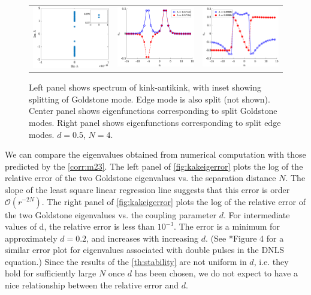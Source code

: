 \documentclass[12pt,reqno]{amsart}
\begin{document}
\begin{figure}[H]
	\begin{center}
	\begin{tabular}{ccc}
	\includegraphics[width=5cm]{kak50_8spec.eps}	&
	\includegraphics[width=5cm]{kak50_8goldstone.eps} &
	\includegraphics[width=5cm]{kak50_8edge.eps}
	\end{tabular}
	\end{center}
	\caption{Left panel shows spectrum of kink-antikink, with inset showing splitting of Goldstone mode. Edge mode is also split (not shown). Center panel shows eigenfunctions corresponding to split Goldstone modes. Right panel shows eigenfunctions corresponding to split edge modes. $d = 0.5$, $N = 4$.}
	\label{fig:kakspec}
\end{figure}

We can compare the eigenvalues obtained from numerical computation with those predicted by the \cref{corr:m23}. The left panel of \cref{fig:kakeigerror} plots the log of the relative error of the two Goldstone eigenvalues vs. the separation distance $N$. The slope of the least square linear regression line suggests that this error is order $\mathcal{O}(r^{-2N})$. The right panel of \cref{fig:kakeigerror} plots the log of the relative error of the two Goldstone eigenvalues vs. the coupling parameter $d$. For intermediate values of d, the relative error is less than $10^{-3}$. The error is a minimum for approximately $d = 0.2$, and increases with increasing $d$. (See \cite{Parker2020}*{Figure 4} for a similar error plot for eigenvalues associated with double pulses in the DNLS equation.) Since the results of the \cref{th:stability} are not uniform in $d$, i.e. they hold for sufficiently large $N$ once $d$ has been chosen, we do not expect to have a nice relationship between the relative error and $d$.
\end{document}
